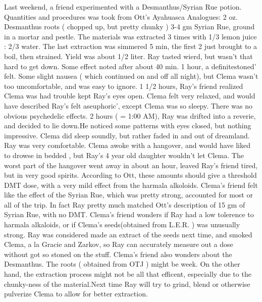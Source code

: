 \documentclass[12pt]{book}
\begin{document}
Last weekend, a friend experimented with a Desmanthus/Syrian Rue potion. Quantities and procedures was took from Ott's Ayahuasca Analogues: 2 oz. Desmanthus roots ( chopped up, but pretty chunky ) 3-4 gm Syrian Rue, ground in a mortar and pestle. The materials was extracted 3 times with 1/3 lemon juice : 2/3 water. The last extraction was simmered 5 min, the first 2 just brought to a boil, then strained. Yield was about 1/2 liter. Ray tasted wierd, but wasn't that hard to get down. Some effect noted after about 40 min. 1 hour, a definitestoned' felt. Some slight nausea ( which continued on and off all night), but Clema wasn't too uncomfortable, and was easy to ignore. 1 1/2 hours, Ray's friend realized Clema was had trouble kept Ray's eyes open. Clema felt very relaxed, and would have described Ray's felt aseuphoric', except Clema was so sleepy. There was no obvious psychedelic effects. 2 hours ( = 1:00 AM), Ray was drifted into a reverie, and decided to lie down.He noticed some patterns with eyes closed, but nothing impressive. Clema did sleep soundly, but rather faded in and out of dreamland. Ray was very comfortable. Clema awoke with a hangover, and would have liked to drowse in bedded , but Ray's 4 year old daughter wouldn't let Clema. The worst part of the hangover went away in about an hour, leaved Ray's friend tired, but in very good spirits. According to Ott, these amounts should give a threshold DMT dose, with a very mild effect from the harmala alkoloids. Clema's friend felt like the effect of the Syrian Rue, which was pretty strong, accounted for most or all of the trip. In fact Ray pretty much matched Ott's description of 15 gm of Syrian Rue, with no DMT. Clema's friend wonders if Ray had a low tolerence to harmala alkaloids, or if Clema's seeds(obtained from L.E.R. ) was unusually strong. Ray was considered made an extract of the seeds next time, and smoked Clema, a la Gracie and Zarkov, so Ray can accurately measure out a dose without got so stoned on the stuff. Clema's friend also wonders about the Desmanthus. The roots (  obtained from OTJ  ) might be week. On the other hand, the extraction process might not be all that efficent, especially due to the chunky-ness of the material.Next time Ray will try to grind, blend or otherwise pulverize Clema to allow for better extraction.
\end{document}
